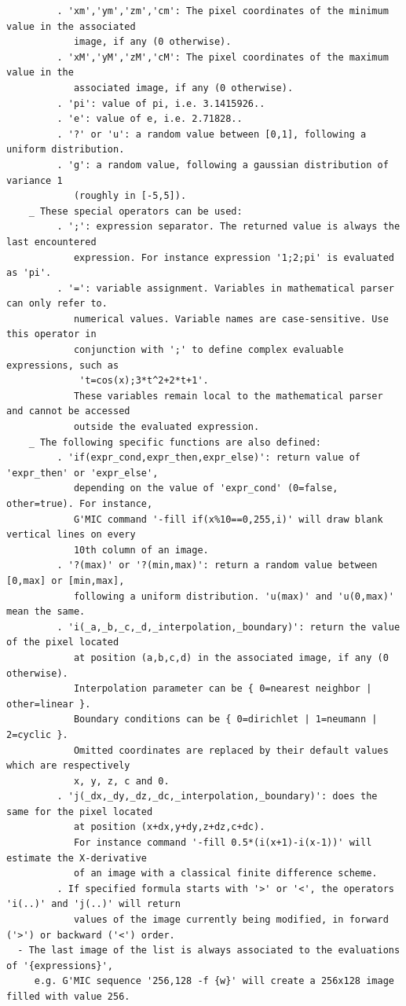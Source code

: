 \documentclass[a4paper,11pt,twoside]{book}
\begin{document}
\begin{lstlisting}
         . 'xm','ym','zm','cm': The pixel coordinates of the minimum value in the associated 
            image, if any (0 otherwise). 
         . 'xM','yM','zM','cM': The pixel coordinates of the maximum value in the 
            associated image, if any (0 otherwise). 
         . 'pi': value of pi, i.e. 3.1415926.. 
         . 'e': value of e, i.e. 2.71828.. 
         . '?' or 'u': a random value between [0,1], following a uniform distribution. 
         . 'g': a random value, following a gaussian distribution of variance 1 
            (roughly in [-5,5]). 
    _ These special operators can be used: 
         . ';': expression separator. The returned value is always the last encountered 
            expression. For instance expression '1;2;pi' is evaluated as 'pi'. 
         . '=': variable assignment. Variables in mathematical parser can only refer to. 
            numerical values. Variable names are case-sensitive. Use this operator in 
            conjunction with ';' to define complex evaluable expressions, such as 
             't=cos(x);3*t^2+2*t+1'. 
            These variables remain local to the mathematical parser and cannot be accessed 
            outside the evaluated expression. 
    _ The following specific functions are also defined: 
         . 'if(expr_cond,expr_then,expr_else)': return value of 'expr_then' or 'expr_else', 
            depending on the value of 'expr_cond' (0=false, other=true). For instance, 
            G'MIC command '-fill if(x%10==0,255,i)' will draw blank vertical lines on every 
            10th column of an image. 
         . '?(max)' or '?(min,max)': return a random value between [0,max] or [min,max], 
            following a uniform distribution. 'u(max)' and 'u(0,max)' mean the same. 
         . 'i(_a,_b,_c,_d,_interpolation,_boundary)': return the value of the pixel located 
            at position (a,b,c,d) in the associated image, if any (0 otherwise). 
            Interpolation parameter can be { 0=nearest neighbor | other=linear }. 
            Boundary conditions can be { 0=dirichlet | 1=neumann | 2=cyclic }. 
            Omitted coordinates are replaced by their default values which are respectively 
            x, y, z, c and 0. 
         . 'j(_dx,_dy,_dz,_dc,_interpolation,_boundary)': does the same for the pixel located 
            at position (x+dx,y+dy,z+dz,c+dc). 
            For instance command '-fill 0.5*(i(x+1)-i(x-1))' will estimate the X-derivative 
            of an image with a classical finite difference scheme. 
         . If specified formula starts with '>' or '<', the operators 'i(..)' and 'j(..)' will return 
            values of the image currently being modified, in forward ('>') or backward ('<') order. 
  - The last image of the list is always associated to the evaluations of '{expressions}', 
     e.g. G'MIC sequence '256,128 -f {w}' will create a 256x128 image filled with value 256.
\end{lstlisting}
\normalsize
\end{document}
